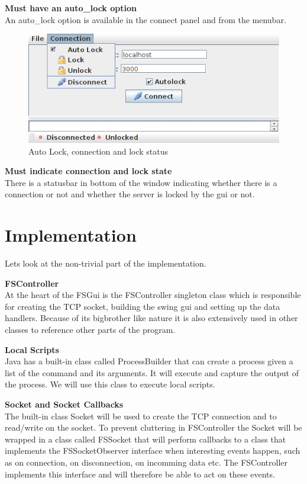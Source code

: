 \textbf{Must have an auto\_lock option} \\
An auto\_lock option is available in the connect panel and from the menubar.

\begin{figure}[h!] \centering
	\includegraphics[scale=0.5]{img/fsgui_autolock}
  \caption{Auto Lock, connection and lock status}
\end{figure}

\textbf{Must indicate connection and lock state} \\
There is a statusbar in bottom of the window indicating whether there is a connection or not and whether the server is locked by the gui or not.










\section{Implementation}
Lets look at the non-trivial part of the implementation.

\textbf{FSController} \\
At the heart of the FSGui is the FSController singleton class which is responsible for creating the TCP socket, building the swing gui and setting up the data handlers. Because of its bigbrother like nature it is also extensively used in other classes to reference other parts of the program.

\textbf{Local Scripts} \\
Java has a built-in class called ProcessBuilder that can create a process given a list of the command and its arguments. It will execute and capture the output of the process. We will use this class to execute local scripts.

\textbf{Socket and Socket Callbacks} \\
The built-in class Socket will be used to create the TCP connection and to read/write on the socket. To prevent cluttering in FSController the Socket will be wrapped in a class called FSSocket that will perform callbacks to a class that implements the FSSocketObserver interface when interesting events happen, such as on connection, on disconnection, on incomming data etc. The FSController implements this interface and will therefore be able to act on these events.

